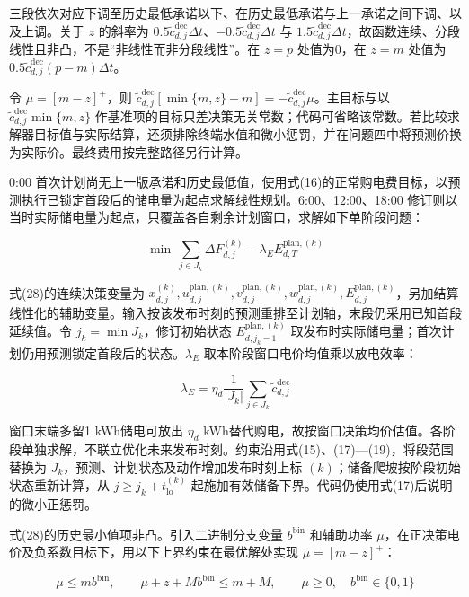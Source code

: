 \documentclass[12pt,a4paper]{ctexart}
\begin{document}
三段依次对应下调至历史最低承诺以下、在历史最低承诺与上一承诺之间下调、以及上调。关于 $z$ 的斜率为 $0.5\widetilde c_{d,j}^{\mathrm{dec}}\Delta t$、$-0.5\widetilde c_{d,j}^{\mathrm{dec}}\Delta t$ 与 $1.5\widetilde c_{d,j}^{\mathrm{dec}}\Delta t$，故函数连续、分段线性且非凸，不是``非线性而非分段线性''。在 $z=p$ 处值为0，在 $z=m$ 处值为 $0.5\widetilde c_{d,j}^{\mathrm{dec}}(p-m)\Delta t$。

令 $\mu=[m-z]^+$，则 $\widetilde c_{d,j}^{\mathrm{dec}}[\min\{m,z\}-m]=-\widetilde c_{d,j}^{\mathrm{dec}}\mu$。主目标与以 $\widetilde c_{d,j}^{\mathrm{dec}}\min\{m,z\}$ 作基准项的目标只差决策无关常数；代码可省略该常数。若比较求解器目标值与实际结算，还须排除终端水值和微小惩罚，并在问题四中将预测价换为实际价。最终费用按完整路径另行计算。

0:00 首次计划尚无上一版承诺和历史最低值，使用式(16)的正常购电费目标，以预测执行已锁定首段后的储电量为起点求解线性规划。6:00、12:00、18:00 修订则以当时实际储电量为起点，只覆盖各自剩余计划窗口，求解如下单阶段问题：

\begin{equation}
\min\ \sum_{j\in J_k}\Delta F_{d,j}^{(k)}-\lambda_E E_{d,T}^{\mathrm{plan},(k)}
\end{equation}

式(28)的连续决策变量为 $x_{d,j}^{(k)},u_{d,j}^{\mathrm{plan},(k)},v_{d,j}^{\mathrm{plan},(k)},w_{d,j}^{\mathrm{plan},(k)},E_{d,j}^{\mathrm{plan},(k)}$，另加结算线性化的辅助变量。输入按该发布时刻的预测重排至计划轴，末段仍采用已知首段延续值。令 $j_k=\min J_k$，修订初始状态 $E_{d,j_k-1}^{\mathrm{plan},(k)}$ 取发布时实际储电量；首次计划仍用预测锁定首段后的状态。$\lambda_E$ 取本阶段窗口电价均值乘以放电效率：

\begin{equation}
\lambda_E=\eta_d\frac{1}{|J_k|}\sum_{j\in J_k}\widetilde c_{d,j}^{\mathrm{dec}}
\end{equation}

窗口末端多留1 kWh储电可放出 $\eta_d$ kWh替代购电，故按窗口决策均价估值。各阶段单独求解，不联立优化未来发布时刻。约束沿用式(15)、(17)—(19)，将段范围替换为 $J_k$，预测、计划状态及动作增加发布时刻上标 $(k)$；储备爬坡按阶段初始状态重新计算，从 $j\ge j_k+t_{\mathrm{lo}}^{(k)}$ 起施加有效储备下界。代码仍使用式(17)后说明的微小正惩罚。

式(28)的历史最小值项非凸。引入二进制分支变量 $b^{\mathrm{bin}}$ 和辅助功率 $\mu$，在正决策电价及负系数目标下，用以下上界约束在最优解处实现 $\mu=[m-z]^+$：

\begin{equation}
\mu\le mb^{\mathrm{bin}},\qquad \mu+z+Mb^{\mathrm{bin}}\le m+M,\qquad \mu\ge0,\quad b^{\mathrm{bin}}\in\{0,1\}
\end{equation}
\end{document}
